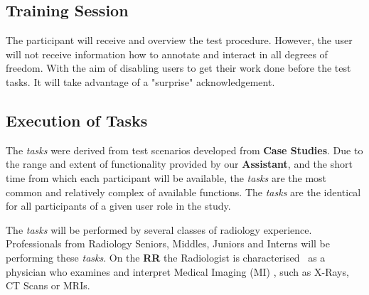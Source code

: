 

\subsection{Training Session}

The participant will receive and overview the test procedure. However, the user will not receive information how to annotate and interact in all degrees of freedom. With the aim of disabling users to get their work done before the test tasks. It will take advantage of a "surprise" acknowledgement.


\subsection{Execution of Tasks}

The \textit{tasks} were derived from test scenarios developed from \textbf{Case Studies}. Due to the range and extent of functionality provided by our \textbf{Assistant}, and the short time from which each participant will be available, the \textit{tasks} are the most common and relatively complex of available functions. The \textit{tasks} are the identical for all participants of a given user role in the study.

The \textit{tasks} will be performed by several classes of radiology experience. Professionals from Radiology Seniors, Middles, Juniors and Interns will be performing these \textit{tasks}. On the \textbf{RR} the Radiologist is characterised~\cite{ehrlich2016patient, miglioretti2007radiologist} as a physician who examines and interpret Medical Imaging (MI) \cite{kobashi2017evaluation}, such as X-Rays, CT Scans or MRIs.



